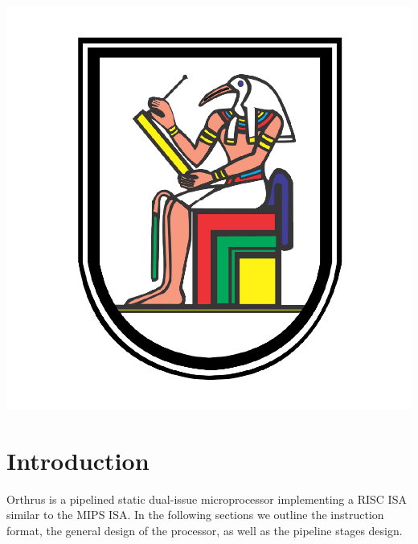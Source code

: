 \documentclass[12pt]{article}
\theoremstyle{plain}
\theoremstyle{definition}
\begin{document}
\begin{titlepage}
	
	
	\includegraphics[scale=0.15]{cu_logo.png}\\[1cm] %
	 
	
	\vfill %
	
\end{titlepage}

\section{Introduction}
Orthrus is a pipelined static dual-issue microprocessor implementing a RISC ISA similar to the MIPS ISA. In the following sections we outline the instruction format, the general design of the processor, as well as the pipeline stages design.
\end{document}
